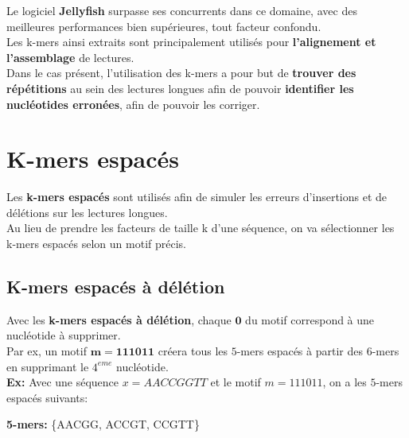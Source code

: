 \documentclass{report}
\begin{document}
      Le logiciel \textbf{Jellyfish} \cite{Marcais2011} surpasse ses concurrents dans ce domaine, avec des meilleures performances bien supérieures, tout facteur confondu.\\

      Les k-mers ainsi extraits sont principalement utilisés pour \textbf{l'alignement et l'assemblage} de lectures.\\

      Dans le cas présent, l'utilisation des k-mers a pour but de \textbf{trouver des répétitions} au sein des lectures longues afin de pouvoir \textbf{identifier les nucléotides erronées}, afin de pouvoir les corriger.
      \newpage
    \section{K-mers espacés}
      Les \textbf{k-mers espacés} sont utilisés afin de simuler les erreurs d'insertions et de délétions sur les lectures longues.\\
      Au lieu de prendre les facteurs de taille k d'une séquence, on va sélectionner les k-mers espacés selon un motif précis.\\
      \subsection{K-mers espacés à délétion}
        Avec les \textbf{k-mers espacés à délétion}, chaque $\mathbf{0}$ du motif correspond à une nucléotide à supprimer.\\
        Par ex, un motif $\mathbf{m=111011}$ créera tous les $5$-mers espacés à partir des $6$-mers en supprimant le    $4^{eme}$ nucléotide.\\
        \textbf{Ex:} Avec une séquence $x = AACCGGTT$ et le motif $m = 111011$, on a les $5$-mers espacés suivants:\\
        \begin{center}\end{center}
        \textbf{5-mers:} \{AACGG, ACCGT, CCGTT\}
\end{document}
